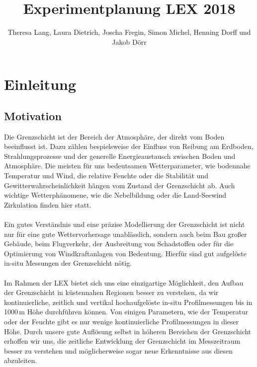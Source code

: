 \documentclass[a4paper,11pt,DIV=calc,tablecaptionabove,headinclude,twoside]{article}
\title{Experimentplanung LEX 2018}%
\author{Theresa Lang, Laura Dietrich, Joscha Fregin, Simon Michel, Henning Dorff und Jakob Dörr}
\begin{document}
\maketitle



\section{Einleitung}
\subsection{Motivation}
Die Grenzschicht ist der Bereich der Atmosphäre, der direkt vom Boden beeinflusst ist. Dazu zählen bespielsweise der Einfluss von Reibung am Erdboden, Strahlungsprozesse und der generelle Energieaustausch zwischen Boden und Atmosphäre. Die meisten für uns bedeutsamen Wetterparameter, wie bodennahe Temperatur und Wind, die relative Feuchte oder die Stabilität und Gewitterwahrscheinlichkeit hängen vom Zustand der Grenzschicht ab. Auch wichtige Wetterphänomene, wie die Nebelbildung oder die Land-Seewind Zirkulation finden hier statt.\\\\
Ein gutes Verständnis und eine präzise Modellierung der Grenzschicht ist nicht nur für eine gute Wettervorhersage unablässlich, sondern auch beim Bau großer Gebäude, beim Flugverkehr, der Ausbreitung von Schadstoffen oder für die Optimierung von Windkraftanlagen von Bedeutung. Hierfür sind gut aufgelöste in-situ Messungen der Grenzschicht nötig.\\\\
Im Rahmen der LEX bietet sich uns eine einzigartige Möglichkeit, den Aufbau der Grenzschicht in küstennahen Regionen besser zu verstehen, da wir kontinuierliche, zeitlich und vertikal hochaufgelöste in-situ Profilmessungen bis in 1000\,m Höhe durchführen können. Von einigen Parametern, wie der Temperatur oder der Feuchte gibt es nur wenige kontinuierliche Profilmessungen in dieser Höhe. Durch unsere gute Auflösung selbst in höheren Bereichen der Grenzschicht erhoffen wir uns, die zeitliche Entwicklung der Grenzschicht im Messzeitraum besser zu verstehen und möglicherweise sogar neue Erkenntnisse aus diesen abzuleiten.
\end{document}
